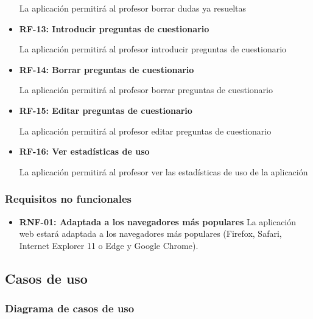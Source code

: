 \documentclass[openright,twoside,10pt]{book}
\providecommand{\tightlist}{%
  \setlength{\itemsep}{0pt}\setlength{\parskip}{0pt}}
\begin{document}
\begin{itemize}
      La aplicación permitirá al profesor borrar dudas ya resueltas
    \item
      \textbf{RF-13: Introducir preguntas de cuestionario}
    
      La aplicación permitirá al profesor introducir preguntas de
      cuestionario
    \item
      \textbf{RF-14: Borrar preguntas de cuestionario}
    
      La aplicación permitirá al profesor borrar preguntas de cuestionario
    \item
      \textbf{RF-15: Editar preguntas de cuestionario}
    
      La aplicación permitirá al profesor editar preguntas de cuestionario
    \item
      \textbf{RF-16: Ver estadísticas de uso}
    
      La aplicación permitirá al profesor ver las estadísticas de uso de la
      aplicación
    \end{itemize}
    
    \subsubsection{Requisitos no
    funcionales}\label{requisitos-no-funcionales}
    
    \begin{itemize}
    \tightlist
    \item
      \textbf{RNF-01: Adaptada a los navegadores más populares} La
      aplicación web estará adaptada a los navegadores más populares
      (Firefox, Safari, Internet Explorer 11 o Edge y Google Chrome).
    \end{itemize}
    
    \subsection{Casos de uso}\label{casos-de-uso}
    
    \subsubsection{Diagrama de casos de uso}\label{diagrama-de-casos-de-uso}
    
\end{document}
